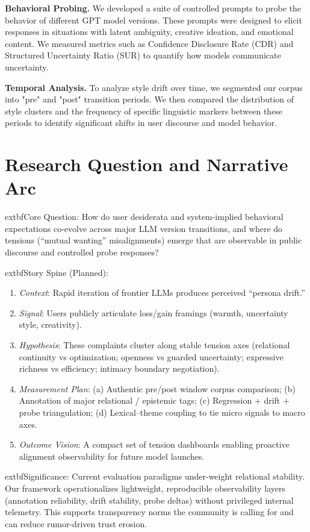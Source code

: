 \documentclass{article}
\begin{document}
\textbf{Behavioral Probing.} We developed a suite of controlled prompts to probe the behavior of different GPT model versions. These prompts were designed to elicit responses in situations with latent ambiguity, creative ideation, and emotional content. We measured metrics such as Confidence Disclosure Rate (CDR) and Structured Uncertainty Ratio (SUR) to quantify how models communicate uncertainty.

\textbf{Temporal Analysis.} To analyze style drift over time, we segmented our corpus into "pre" and "post" transition periods. We then compared the distribution of style clusters and the frequency of specific linguistic markers between these periods to identify significant shifts in user discourse and model behavior.

\section{Research Question and Narrative Arc}
	extbf{Core Question:} How do user desiderata and system-implied behavioral expectations co-evolve across major LLM version transitions, and where do tensions (“mutual wanting” misalignments) emerge that are observable in public discourse and controlled probe responses?

	extbf{Story Spine (Planned):}
\begin{enumerate}
  \item \emph{Context}: Rapid iteration of frontier LLMs produces perceived “persona drift.”
  \item \emph{Signal}: Users publicly articulate loss/gain framings (warmth, uncertainty style, creativity).
  \item \emph{Hypothesis}: These complaints cluster along stable tension axes (relational continuity vs optimization; openness vs guarded uncertainty; expressive richness vs efficiency; intimacy boundary negotiation).
  \item \emph{Measurement Plan}: (a) Authentic pre/post window corpus comparison; (b) Annotation of major relational / epistemic tags; (c) Regression + drift + probe triangulation; (d) Lexical–theme coupling to tie micro signals to macro axes.
  \item \emph{Outcome Vision}: A compact set of tension dashboards enabling proactive alignment observability for future model launches.
\end{enumerate}

	extbf{Significance}: Current evaluation paradigms under-weight relational stability. Our framework operationalizes lightweight, reproducible observability layers (annotation reliability, drift stability, probe deltas) without privileged internal telemetry. This supports transparency norms the community is calling for and can reduce rumor-driven trust erosion.
\end{document}
